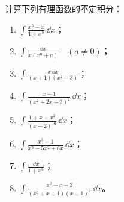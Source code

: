 \begin{xexercise}[2]
计算下列有理函数的不定积分：
  \begin{enumerate}[label=(\arabic*)]
    \item $\displaystyle\int\frac{x^5-x}{1+x^8}\,\dd x$；
    \item $\displaystyle\int\frac{\dd x}{x(x^n+a)}\quad(a\ne0)$；
    \item $\displaystyle\int\frac{x\,\dd x}{(x+1)(x^2+3)}$；
    \item $\displaystyle\int\frac{x-1}{(x^2+2x+3)^2}\,\dd x$；
    \item $\displaystyle\int\frac{1+x+x^2}{(x-2)^{10}}\,\dd x$；
    \item $\displaystyle\int\frac{x^3+1}{x^3-5x^2+6x}\,\dd x$；
    \item $\displaystyle\int\frac{\dd x}{1+x^6}$；
    \item $\displaystyle\int\frac{x^2-x+3}{(x^2+x+1)(x-1)^2}\,\dd x$。
  \end{enumerate}
\end{xexercise}
